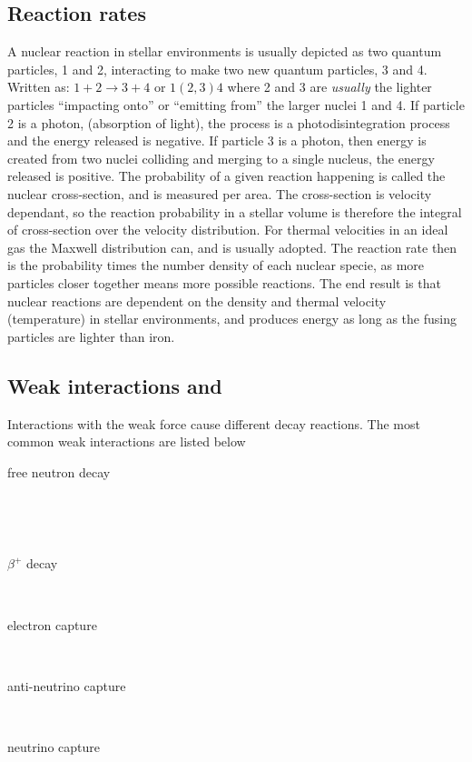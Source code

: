 \subsection{Reaction rates} \label{sec:reaction-rates}
A nuclear reaction in stellar environments is usually depicted as two quantum particles, 1 and 2,
interacting to make two new quantum particles, 3 and 4.
\noindent
Written as: $1+2 \rightarrow 3+4$ or $1(2,3)4$ where 2 and 3 are \textit{usually} the lighter particles
``impacting onto'' or ``emitting from'' the larger nuclei 1 and 4.
If particle 2 is a photon, (absorption of light), the process is a photodisintegration process and the
energy released is negative.
If particle 3 is a photon, then energy is created from two nuclei colliding and merging to a single nucleus,
the energy released is positive.
The probability of a given reaction happening is called the nuclear cross-section, and is measured per area.
The cross-section is velocity dependant, so the reaction probability in a stellar volume is therefore the integral of cross-section over the velocity distribution. For thermal velocities in an ideal gas the Maxwell distribution can, and is usually adopted.
The reaction rate then is the probability times the number density of each nuclear specie, as more particles closer together means
more possible reactions.
The end result is that nuclear reactions are dependent on the density and
thermal velocity (temperature) in stellar environments, and produces energy as long as
the fusing particles are lighter than iron.

\subsection{Weak interactions and \betadecay} \label{sec:betadecay}
Interactions with the weak force cause different decay reactions. The most common weak interactions are listed below
\begin{description}
  \item[free neutron decay]  \\
  \item[\betadecay]  \\
  \item[$\beta^+$ decay]  \\
  \item[electron capture]  \\
  \item[anti-neutrino capture]  \\
  \item[neutrino capture]  \\
\end{description}

